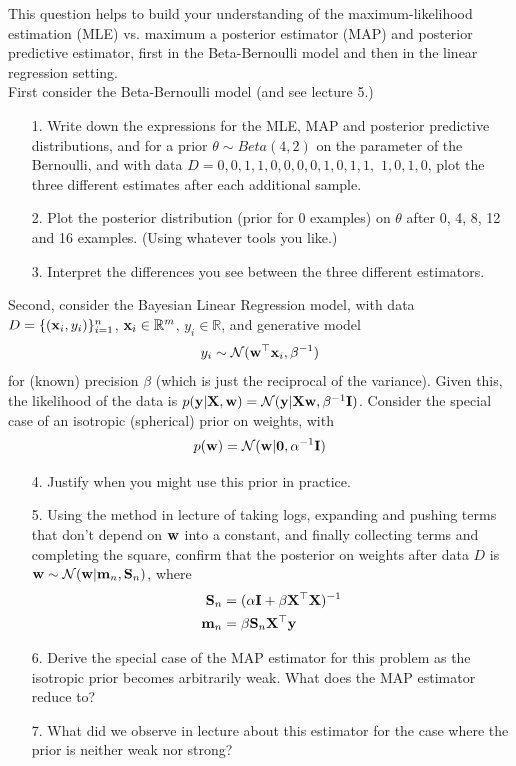 \documentclass[submit]{harvardml}
\begin{document}
\newpage
\begin{problem}

  This question helps to build your understanding of the
  maximum-likelihood estimation (MLE) vs. maximum a posterior estimator
  (MAP) and posterior predictive estimator, first in the
  Beta-Bernoulli model and then in the linear regression setting.\\

First consider the Beta-Bernoulli model (and see lecture 5.)
%
\begin{enumerate}
\item[1.] Write down the expressions for the MLE, MAP and posterior predictive
distributions, and for
a prior $\theta\sim Beta(4,2)$ on the
parameter of the Bernoulli,
and  with data $D= 0, 0, 1, 1, 0, 0, 0, 0, 1, 0, 1, 1,$
$1, 0, 1, 0$, plot
the three different
estimates after each additional
sample.
%
\item[2.] Plot the posterior distribution (prior for 0 examples) on $\theta$ after 0, 4, 8, 12 and 16
examples. (Using whatever tools you like.)
%
\item[3.] Interpret the differences you see between the three different
estimators.
%
%
\end{enumerate}

Second, consider the Bayesian Linear Regression model, with
data $D=\{(\mathbf{x}_i,y_i)\}_{i=1}^n$, $\mathbf{x}_i\in\mathbb{R}^m$,
 $y_i\in\mathbb{R}$, and generative model
%
$$
y_i\sim\mathcal{N}(\mathbf{w}^\top\mathbf{x}_i,\beta^{-1})
$$
for (known) precision $\beta$ (which is just the reciprocal
of the variance). Given this, the likelihood of the
data is $p(\mathbf{y}|\mathbf{X},\mathbf{w}) = \mathcal{N}(\mathbf{y}|\mathbf{X}\mathbf{w},\beta^{-1}\mathbf{I})$. Consider the special case of
an isotropic (spherical) prior on weights, with
%
$$
p(\mathbf{w})=\mathcal{N}(\mathbf{w}|\bold0,\alpha^{-1}\mathbf{I})
$$

\begin{enumerate}
\item[4.] Justify when you might use this prior in practice.
%
\item[5.] Using the method in lecture of taking logs, expanding and pushing terms
that don't depend on $\mathbf{w}$ into a constant, and finally collecting
terms and completing the square, confirm that the posterior on
weights after data $D$ is $\mathbf{w}\sim\mathcal{N}(\mathbf{w}|\mathbf{m}_n,\mathbf{S}_n)$,
where
%
\begin{align*}
\mathbf{S}_n&=(\alpha\mathbf{I}+\beta\mathbf{X}^\top\mathbf{X})^{-1}\\
\mathbf{m}_n&=\beta\mathbf{S}_n\mathbf{X}^\top\mathbf{y}
\end{align*}
\item[6.] Derive the special case
of the MAP estimator for this problem as the isotropic
prior becomes arbitrarily weak.
What does the MAP estimator reduce to?
%
\item[7.] What did we observe in lecture about this
estimator for the case where
the prior is neither weak nor strong?
\end{enumerate}
\end{problem}
\end{document}
